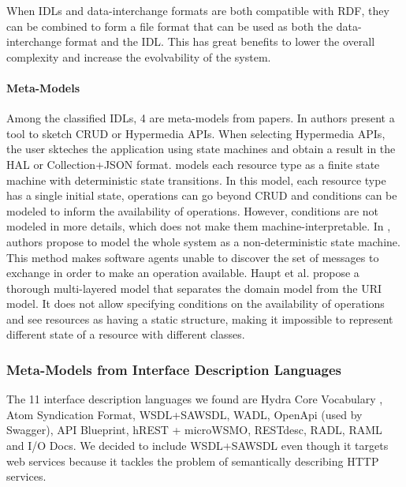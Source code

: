 When IDLs and data-interchange formats are both compatible with RDF, they can be combined to form a file format that can be used as both the data-interchange format and the IDL. This has great benefits to lower the overall complexity and increase the evolvability of the system.

\paragraph{Meta-Models}

Among the classified IDLs, 4 are meta-models from papers. In \cite{Rapido} authors present a tool to sketch CRUD or Hypermedia APIs. When selecting Hypermedia APIs, the user skteches the application using state machines and obtain a result in the HAL or Collection+JSON format. \cite{Schreier:2011:MRA:1967428.1967434} models each resource type as a finite state machine with deterministic state transitions. In this model, each resource type has a single initial state, operations can go beyond CRUD and conditions can be modeled to inform the availability of operations. However, conditions are not modeled in more details, which does not make them machine-interpretable. In \cite{10.1007/978-3-642-22233-7_24}, authors propose to model the whole system as a non-deterministic state machine. This method makes software agents unable to discover the set of messages to exchange in order to make an operation available. Haupt et al. \cite{10.1109/ICWS.2014.30} propose a thorough multi-layered model that separates the domain model from the URI model. It does not allow specifying conditions on the availability of operations and see resources as having a static structure, making it impossible to represent different state of a resource with different classes. 

\subsubsection{Meta-Models from Interface Description Languages}

The 11 interface description languages we found are Hydra Core Vocabulary \cite{Lanthaler:2013:CGW:2487788.2487799}, Atom Syndication Format\cite{AtomSF}, WSDL+SAWSDL, WADL, OpenApi (used by Swagger), API Blueprint, hREST + microWSMO, RESTdesc, RADL, RAML and I/O Docs. We decided to include WSDL+SAWSDL even though it targets web services \cite{john2012framework} because it tackles the problem of semantically describing HTTP services.

